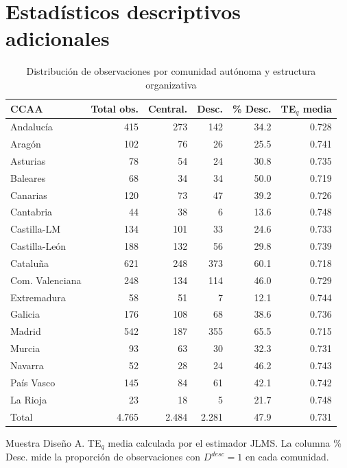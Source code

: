\documentclass[12pt, a4paper, twoside, openright]{book}
\theoremstyle{plain}
\theoremstyle{definition}
\theoremstyle{remark}
\begin{document}
\section{Estadísticos descriptivos adicionales}
\label{sec:descriptivos_adicionales}

\begin{table}[htbp]
\centering
\caption{Distribución de observaciones por comunidad autónoma y estructura organizativa}
\label{tab:distribucion_ccaa}
\begin{threeparttable}
\small
\begin{tabular}{lrrrrr}
\toprule
\textbf{CCAA} & \textbf{Total obs.} & \textbf{Central.} & \textbf{Desc.}
  & \textbf{\% Desc.} & \textbf{TE$_q$ media} \\
\midrule
Andalucía       & 415 & 273 & 142 & 34.2 & 0.728 \\
Aragón          & 102 & 76  & 26  & 25.5 & 0.741 \\
Asturias        & 78  & 54  & 24  & 30.8 & 0.735 \\
Baleares        & 68  & 34  & 34  & 50.0 & 0.719 \\
Canarias        & 120 & 73  & 47  & 39.2 & 0.726 \\
Cantabria       & 44  & 38  & 6   & 13.6 & 0.748 \\
Castilla-LM     & 134 & 101 & 33  & 24.6 & 0.733 \\
Castilla-León   & 188 & 132 & 56  & 29.8 & 0.739 \\
Cataluña        & 621 & 248 & 373 & 60.1 & 0.718 \\
Com. Valenciana & 248 & 134 & 114 & 46.0 & 0.729 \\
Extremadura     & 58  & 51  & 7   & 12.1 & 0.744 \\
Galicia         & 176 & 108 & 68  & 38.6 & 0.736 \\
Madrid          & 542 & 187 & 355 & 65.5 & 0.715 \\
Murcia          & 93  & 63  & 30  & 32.3 & 0.731 \\
Navarra         & 52  & 28  & 24  & 46.2 & 0.743 \\
País Vasco      & 145 & 84  & 61  & 42.1 & 0.742 \\
La Rioja        & 23  & 18  & 5   & 21.7 & 0.748 \\
\midrule
Total           & 4.765 & 2.484 & 2.281 & 47.9 & 0.731 \\
\bottomrule
\end{tabular}
\begin{tablenotes}
  \small
  \item Muestra Diseño A. TE$_q$ media calculada por el estimador JLMS. La columna \% Desc. mide la proporción de observaciones con $D^{desc}=1$ en cada comunidad.
\end{tablenotes}
\end{threeparttable}
\end{table}
\end{document}
